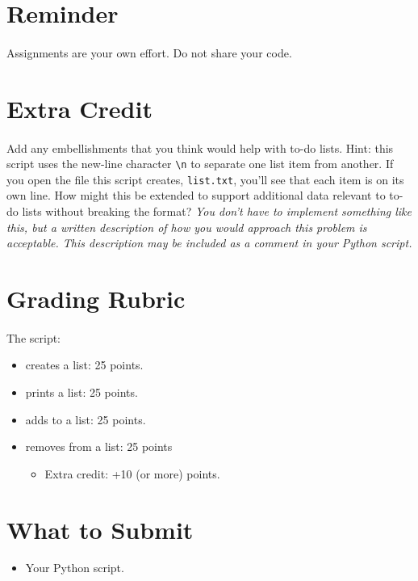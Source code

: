 \documentclass[letter,10pt]{article}
\begin{document}
    \section*{Reminder}
    \paragraph{}Assignments are your own effort. Do not share your code.
    
    \section*{Extra Credit}
    \paragraph{}Add any embellishments that you think would help with to-do lists. Hint: this script uses the new-line character \verb|\n| to separate one list item from another. If you open the file this script creates, \verb|list.txt|, you'll see that each item is on its own line. How might this be extended to support additional data relevant to to-do lists without breaking the format? \textit{You don't have to implement something like this, but a written description of how you would approach this problem is acceptable. This description may be included as a comment in your Python script.}
    
    \section*{Grading Rubric}
    \paragraph{}The script:
    \begin{itemize}
        \item creates a list: 25 points.
        \item prints a list: 25 points.
        \item adds to a list: 25 points.
        \item removes from a list: 25 points
        \begin{itemize}
            \item Extra credit: +10 (or more) points.
        \end{itemize}
    \end{itemize}
    
    \section*{What to Submit}
    \begin{itemize}
        \item Your Python script.
    \end{itemize}
    
\end{document}

